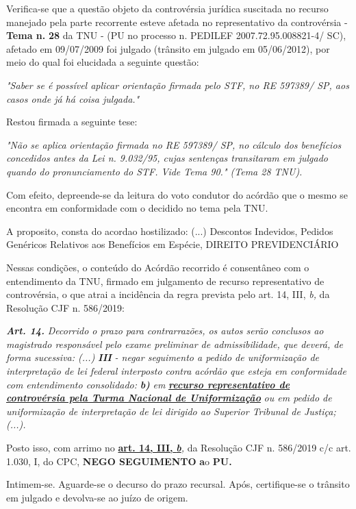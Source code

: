 \documentclass[12pt]{article}
\begin{document}
\justifying
\noindent Verifica-se que a questão objeto da controvérsia jurídica suscitada no recurso manejado pela parte recorrente esteve afetada no representativo da controvérsia - \textbf{Tema n. }\textbf{28} da TNU - (PU no processo n. PEDILEF 2007.72.95.008821-4/ SC),  afetado em 09/07/2009 foi julgado (trânsito em julgado em 05/06/2012), por meio do qual foi elucidada a seguinte questão:

\noindent \textit{"Saber se é possível aplicar orientação firmada pelo STF, no RE 597389/ SP, aos casos onde já há coisa julgada."}

\noindent Restou firmada a seguinte tese:

\noindent \textit{"Não se aplica orientação firmada no RE 597389/ SP, no cálculo dos benefícios concedidos antes da Lei n. 9.032/95, cujas sentenças transitaram em julgado quando do pronunciamento do STF. Vide Tema 90." (Tema 28 TNU).}

\noindent Com efeito, depreende-se da leitura do voto condutor do acórdão que o mesmo se encontra em conformidade com o decidido no  tema pela TNU.

\noindent A proposito, consta do acordao hostilizado: (...) Descontos Indevidos, Pedidos Genéricos Relativos aos Benefícios em Espécie, DIREITO PREVIDENCIÁRIO

\noindent Nessas condições, o conteúdo do Acórdão recorrido é consentâneo com o entendimento da TNU, firmado em julgamento de recurso representativo de controvérsia, o que atrai a incidência da regra prevista pelo art. 14, III, \textit{b,} da Resolução CJF n. 586/2019:

\noindent \textit{\textbf{Art. 14.}}\textit{ Decorrido o prazo para contrarrazões, os autos serão conclusos ao magistrado responsável pelo exame preliminar de admissibilidade, que deverá, de forma sucessiva: (...) }\textit{\textbf{III }}\textit{- negar seguimento a pedido de uniformização de interpretação de lei federal interposto contra acórdão que esteja em conformidade com entendimento consolidado: }\textit{\textbf{b)}}\textit{ em }\uline{\textit{\textbf{recurso representativo de controvérsia pela Turma Nacional de Uniformização}}}\textit{ ou em pedido de uniformização de interpretação de lei dirigido ao Superior Tribunal de Justiça;(...).}

\noindent Posto isso, com arrimo no \uline{\textbf{art. 14, III, }}\uline{\textit{\textbf{b}}}\textit{,} da Resolução CJF n. 586/2019 c/c art. 1.030, I, do CPC, \textbf{NEGO SEGUIMENTO }\textbf{a}o\textbf{ PU}\textbf{.}

\noindent Intimem-se. Aguarde-se o decurso do prazo recursal. Após, certifique-se o trânsito em julgado e devolva-se ao juízo de origem.
\end{document}
